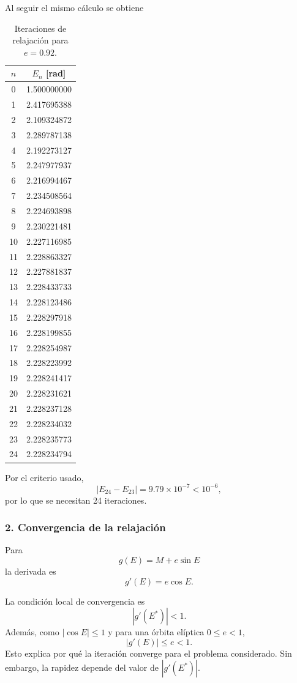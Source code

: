 \documentclass[11pt,a4paper]{article}
\begin{document}
Al seguir el mismo cálculo se obtiene
\begin{table}[H]
\centering
\caption{Iteraciones de relajación para $e=0.92$.}
\begin{tabular}{c|c}
\toprule
$n$ & $E_n$ [rad]\\
\midrule
0&1.500000000\\
1&2.417695388\\
2&2.109324872\\
3&2.289787138\\
4&2.192273127\\
5&2.247977937\\
6&2.216994467\\
7&2.234508564\\
8&2.224693898\\
9&2.230221481\\
10&2.227116985\\
11&2.228863327\\
12&2.227881837\\
13&2.228433733\\
14&2.228123486\\
15&2.228297918\\
16&2.228199855\\
17&2.228254987\\
18&2.228223992\\
19&2.228241417\\
20&2.228231621\\
21&2.228237128\\
22&2.228234032\\
23&2.228235773\\
24&2.228234794\\
\bottomrule
\end{tabular}
\end{table}

Por el criterio usado,
\[
|E_{24}-E_{23}|=9.79\times10^{-7}<10^{-6},
\]
por lo que se necesitan 24 iteraciones.

\subsubsection*{2. Convergencia de la relajación}

Para
\[
g(E)=M+e\sin E
\]
la derivada es
\begin{equation}
\boxed{g'(E)=e\cos E.}
\end{equation}

La condición local de convergencia es
\[
|g'(E^*)|<1.
\]
Además, como $|\cos E|\le 1$ y para una órbita elíptica $0\le e<1$,
\begin{equation}
|g'(E)|\le e<1.
\end{equation}
Esto explica por qué la iteración converge para el problema considerado. Sin embargo, la rapidez depende del valor de $|g'(E^*)|$.
\end{document}
